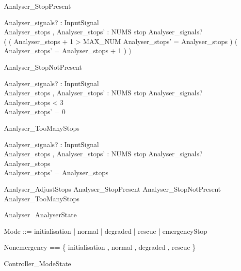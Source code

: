 \documentclass{article}
\begin{document}
\begin{schema}{Analyser\_StopPresent}

 Analyser\_signals? : \power InputSignal \\
 Analyser\_stops , Analyser\_stops' : NUMS 
\where
 stop \in Analyser\_signals? \\
 ( ( Analyser\_stops + 1 > MAX\_NUM \land Analyser\_stops' = Analyser\_stops ) \lor ( Analyser\_stops' = Analyser\_stops + 1 ) )
\end{schema}

\begin{schema}{Analyser\_StopNotPresent}

 Analyser\_signals? : \power InputSignal \\
 Analyser\_stops , Analyser\_stops' : NUMS 
\where
 stop \notin Analyser\_signals? \land Analyser\_stops < 3 \\
 Analyser\_stops' = 0
\end{schema}

\begin{schema}{Analyser\_TooManyStops}

 Analyser\_signals? : \power InputSignal \\
 Analyser\_stops , Analyser\_stops' : NUMS 
\where
 stop \notin Analyser\_signals? \land Analyser\_stops  \\
 Analyser\_stops' = Analyser\_stops
\end{schema}

\begin{zed}
	Analyser\_AdjustStops  Analyser\_StopPresent \lor Analyser\_StopNotPresent \lor Analyser\_TooManyStops
\end{zed}

\begin{zed}
	Analyser\_AnalyserState 
\end{zed}

\begin{zed}
	Mode ::= initialisation | normal | degraded | rescue | emergencyStop
\end{zed}

\begin{zed}
	Nonemergency == \{ initialisation , normal , degraded , rescue \}
\end{zed}

\begin{zed}
	Controller\_ModeState 
\end{zed}
\end{document}
